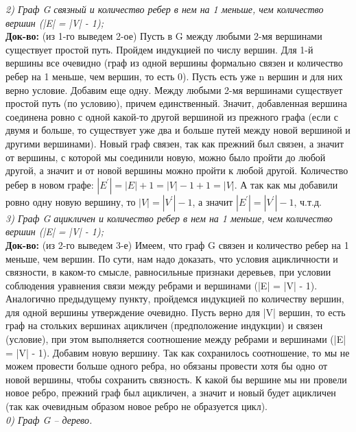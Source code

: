 \documentclass[12pt]{article}
\begin{document}
\textit{2) Граф G связный и количество ребер в нем на 1 меньше, чем количество вершин (|E| = |V| - 1);}
\\

\textbf{Док-во:} (из 1-го выведем 2-ое) Пусть в G между любыми 2-мя вершинами существует простой путь. Пройдем индукцией по числу вершин. Для 1-й вершины все очевидно (граф из одной вершины формально связен и количество ребер на 1 меньше, чем вершин, то есть 0). Пусть есть уже n вершин и для них верно условие. Добавим еще одну. Между любыми 2-мя вершинами существует простой путь (по условию), причем единственный. Значит, добавленная вершина соединена ровно с одной какой-то другой вершиной из прежного графа (если с двумя и больше, то существует уже два и больше путей между новой вершиной и другими вершинами). Новый граф связен, так как прежний был связен, а значит от вершины, с которой мы соединили новую, можно было пройти до любой другой, а значит и от новой вершины можно пройти к любой другой. Количество ребер в новом графе:  \(\mathit{|E^{'}| = |E| + 1 = |V| - 1 + 1 = |V|}\). А так как мы добавили ровно одну новую вершину, то \(\mathit{|V| = |V^{'}| - 1}\), а значит \(\mathit{|E^{'}| = |V^{'}| - 1}\), ч.т.д. 
\\

\textit{3) Граф G ацикличен и количество ребер в нем на 1 меньше, чем количество вершин (|E| = |V| - 1);}
\\

\textbf{Док-во:} (из 2-го выведем 3-е) Имеем, что граф G связен и количество ребер на 1 меньше, чем вершин. По сути, нам надо доказать, что условия ацикличности и связности, в каком-то смысле, равносильные признаки деревьев, при условии соблюдения уравнения связи между ребрами и вершинами (|E| = |V| - 1). Аналогично предыдущему пункту, пройдемся индукцией по количеству вершин, для одной вершины утверждение очевидно. Пусть верно для |V| вершин, то есть граф на стольких вершинах ацикличен (предположение индукции) и связен (условие), при этом выполняется соотношение между ребрами и вершинами (|E| = |V| - 1). Добавим новую вершину. Так как сохранилось соотношение, то мы не можем провести больше одного ребра, но обязаны провести хотя бы одно от новой вершины, чтобы сохранить связность. К какой бы вершине мы ни провели новое ребро, прежний граф был ацикличен, а значит и новый будет ацикличен (так как очевидным образом новое ребро не образуется цикл).
\\

\textit{0) Граф G -- дерево.}
\\
\end{document}
